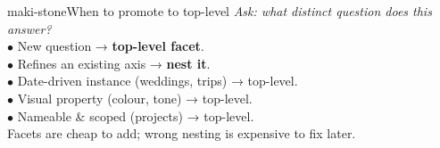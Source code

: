\documentclass[a3paper,landscape,10pt]{article}
\begin{document}
\begin{minipage}[t]{0.64\textwidth}
  \begin{minipage}[t]{0.244\textwidth}\begin{facetcard}{maki-stone}{When to promote to top-level}
    \textit{\small Ask: what distinct question does this answer?}\\[3pt]
    \scriptsize
    $\bullet$ New question → \textbf{top-level facet}.\\
    $\bullet$ Refines an existing axis → \textbf{nest it}.\\
    $\bullet$ Date-driven instance (weddings, trips) → top-level.\\
    $\bullet$ Visual property (colour, tone) → top-level.\\
    $\bullet$ Nameable \& scoped (projects) → top-level.\\[2pt]
    {\color{maki-stone} Facets are cheap to add; wrong
    nesting is expensive to fix later.}
  \end{facetcard}\end{minipage}
\end{minipage}%
\hfill
\end{document}
